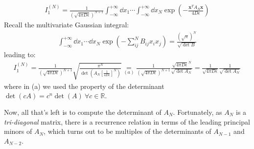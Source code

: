 \documentclass[../template.tex]{subfiles}
\begin{document}
\begin{align*}
    I_1^{(N)} = \frac{1}{(\sqrt{4 \pi D \epsilon})^{N+1}} \int_{-\infty}^{+\infty} \dd{x_1} \cdots \int_{-\infty}^{+\infty} \dd{x_N} \exp\left(-\frac{\bm{x}^T A_N \bm{x}}{4 D \epsilon}  \right)  
\end{align*}
Recall the multivariate Gaussian integral:
\begin{align*}
    \int_{-\infty}^{+\infty} \dd{x_1} \cdots \dd{x_N} \exp\left(-\sum_{ij}^N B_{ij} x_i x_j\right) = \frac{(\sqrt{\pi})^N}{\sqrt{\operatorname{det}B }} 
\end{align*}
leading to:
\begin{align}
    I_1^{(N)} = \frac{1}{(\sqrt{4 \pi D \epsilon})^{N+1}} \sqrt{\frac{\pi^N}{\operatorname{det}\left(A_N \left[\frac{1}{4 D \epsilon} \right]^N\right) } }  \underset{(a)}{=}  \frac{1}{(\sqrt{4 \pi D \epsilon})^{N+1}} \frac{\sqrt{4 \pi D \epsilon}^N}{\sqrt{\operatorname{det} A_N }} = \frac{1}{\sqrt{4 \pi D \epsilon}} \frac{1}{\sqrt{\operatorname{det} A_N}}    
    \label{eqn:I1n}
\end{align}
where in (a) we used the property of the determinant $\operatorname{det}(cA) = c^n \operatorname{det}(A) \> \forall c \in \mathbb{R}$.

Now, all that's left is to compute the determinant of $A_N$. Fortunately, as $A_N$ is a \textit{tri-diagonal} matrix, there is a recurrence relation in terms of the leading principal minors of $A_N$, which turns out to be multiples of the determinants of $A_{N-1}$ and $A_{N-2}$.
\end{document}

